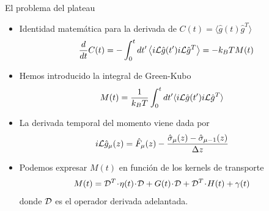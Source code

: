 \documentclass{beamer}
\newcommand{\esc}{\!\cdot\!}
\newcommand{\llangle}{\left\langle}
\newcommand{\rrangle}{\right\rangle}
\begin{document}

\begin{frame}{El problema del plateau}
  \begin{itemize}
    \item<1-> Identidad matemática para la derivada de $C(t)=\langle\hat{g}(t)\hat{g}^T\rangle$
\begin{align}
  \frac{d}{dt}C(t)
=-  \int_0^t dt' \llangle i{\cal L}\hat{g}(t') i{\cal L}\hat{g}^T\rrangle
=-  k_BT M(t)
\nonumber
\end{align}
\item<2-> Hemos introducido la integral de Green-Kubo 
\begin{align}
M(t)&= \frac{1}{k_BT}\int_0^t dt'\langle i{\cal L}\hat{g}(t')i{\cal L} \hat{g}^T\rangle
\nonumber
\end{align}
\item<3-> La derivada temporal del momento viene dada por
\begin{align}
  i{\cal L}\hat{g}_\mu(z) &=\hat{F}_\mu(z)-\frac{\hat{\sigma}_\mu(z)-\hat{\sigma}_{\mu-1}(z)}{\Delta z}
\nonumber
\end{align}
\item<4-> Podemos expresar $M(t)$ en función de los kernels de transporte 
\begin{align}
  {M}(t)&={\cal D}^T\esc{\eta}(t)\esc {\cal D}+{G}(t)\esc {\cal D}+{\cal D}^T\esc{H}(t)+{\gamma}(t)
\nonumber
\end{align}
donde ${\cal D}$ es el operador derivada adelantada. 
  \end{itemize}
\end{frame}
\end{document}
